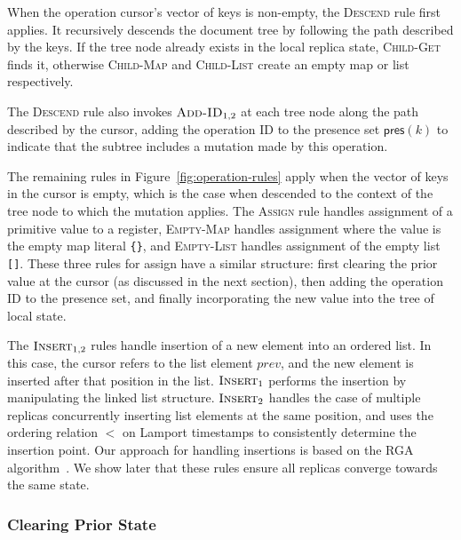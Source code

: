 \documentclass[10pt,journal,compsoc]{IEEEtran}
\begin{document}
When the operation cursor's vector of keys is non-empty, the \textsc{Descend} rule first applies. It recursively descends the document tree by following the path described by the keys. If the tree node already exists in the local replica state, \textsc{Child-Get} finds it, otherwise \textsc{Child-Map} and \textsc{Child-List} create an empty map or list respectively.

The \textsc{Descend} rule also invokes $\textsc{Add-ID}_{1,2}$ at each tree node along the path described by the cursor, adding the operation ID to the presence set $\mathsf{pres}(k)$ to indicate that the subtree includes a mutation made by this operation.

The remaining rules in Figure~\ref{fig:operation-rules} apply when the vector of keys in the cursor is empty, which is the case when descended to the context of the tree node to which the mutation applies. The \textsc{Assign} rule handles assignment of a primitive value to a register, \textsc{Empty-Map} handles assignment where the value is the empty map literal \verb|{}|, and \textsc{Empty-List} handles assignment of the empty list \verb|[]|. These three rules for \textsf{assign} have a similar structure: first clearing the prior value at the cursor (as discussed in the next section), then adding the operation ID to the presence set, and finally incorporating the new value into the tree of local state.

The $\textsc{Insert}_{1,2}$ rules handle insertion of a new element into an ordered list. In this case, the cursor refers to the list element $\mathit{prev}$, and the new element is inserted after that position in the list. $\textsc{Insert}_1$ performs the insertion by manipulating the linked list structure. $\textsc{Insert}_2$ handles the case of multiple replicas concurrently inserting list elements at the same position, and uses the ordering relation $<$ on Lamport timestamps to consistently determine the insertion point. Our approach for handling insertions is based on the RGA algorithm~\cite{Roh:2011dw}. We show later that these rules ensure all replicas converge towards the same state.

\subsubsection{Clearing Prior State}
\end{document}
